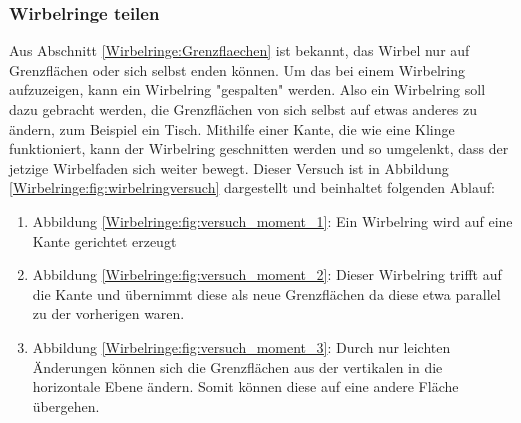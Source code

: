 \subsubsection{Wirbelringe teilen}

Aus Abschnitt \ref{Wirbelringe:Grenzflaechen} ist bekannt, das Wirbel nur auf Grenzflächen oder sich selbst enden können. 
Um das bei einem Wirbelring aufzuzeigen, kann ein Wirbelring "gespalten" werden. 
Also ein Wirbelring soll dazu gebracht werden, die Grenzflächen von sich selbst auf etwas anderes zu ändern, zum Beispiel ein Tisch. 
Mithilfe einer Kante, die wie eine Klinge funktioniert, kann der Wirbelring geschnitten werden und so umgelenkt, dass der jetzige Wirbelfaden sich weiter bewegt. 
Dieser Versuch ist in Abbildung \ref{Wirbelringe:fig:wirbelringversuch} dargestellt und beinhaltet folgenden Ablauf:



\begin{enumerate}
    \item Abbildung \ref{Wirbelringe:fig:versuch_moment_1}: Ein Wirbelring wird auf eine Kante gerichtet erzeugt
    \item Abbildung \ref{Wirbelringe:fig:versuch_moment_2}: Dieser Wirbelring trifft auf die Kante und übernimmt diese als neue Grenzflächen da diese etwa parallel zu der vorherigen waren.
    \item Abbildung \ref{Wirbelringe:fig:versuch_moment_3}: Durch nur leichten Änderungen können sich die Grenzflächen aus der vertikalen in die horizontale Ebene ändern.
    Somit können diese auf eine andere Fläche übergehen.
\end{enumerate}
    
